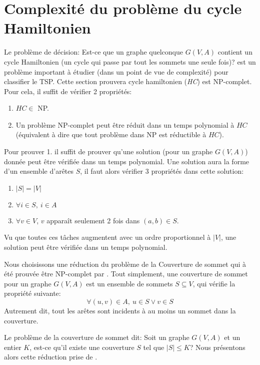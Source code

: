 \documentclass[../main.tex]{subfiles}
\begin{document}
\section{Complexité du problème du cycle Hamiltonien}
Le problème de décision: Est-ce que un graphe quelconque $G(V, A)$ contient un cycle Hamiltonien (un cycle qui passe par tout les sommets une seule fois)? est un problème important à étudier (dans un point de vue de complexité) pour classifier le TSP. Cette section prouvera cycle hamiltonien (\emph{HC}) est NP-complet. Pour cela, il suffit de vérifier 2 propriétés:

\begin{enumerate}
\item $HC \in$ NP.
\item Un problème NP-complet peut être réduit dans un temps polynomial à $HC$ (équivalent à dire que tout problème dans NP est réductible à $HC$).
\end{enumerate}

Pour prouver 1. il suffit de prouver qu'une solution (pour un graphe $G(V,A)$) donnée peut être vérifiée dans un temps polynomial. Une solution aura la forme d'un ensemble d'arêtes $S$, il faut alors vérifier 3 propriétés dans cette solution:

\begin{enumerate}
\item $|S| = |V|$
\item $\forall i \in S, \ i \in A$
\item $\forall v \in V$, $v$ apparaît seulement 2 fois dans $(a, b) \in S$. 
\end{enumerate}

Vu que toutes ces tâches augmentent avec un ordre proportionnel à $|V|$, une solution peut être vérifiée dans un temps polynomial.

Nous choisissons une réduction du problème de la \og Couverture de sommet \fg{} qui à été prouvée être NP-complet par \cite{Karp1972}. Tout simplement, une couverture de sommet pour un graphe $G(V,A)$ est un ensemble de sommets $S \subseteq V$, qui vérifie la propriété suivante:
\[
\forall (u,v) \in A, \ u \in S \lor v \in S
\]
Autrement dit, tout les arêtes sont incidents à au moins un sommet dans la couverture.

Le problème de la couverture de sommet dit: Soit un graphe $G(V,A)$ et un entier $K$, est-ce qu'il existe une couverture $S$ tel que $|S|\leq K$? Nous présentons alors cette réduction prise de \cite{Hartmanis1982}.
\end{document}
